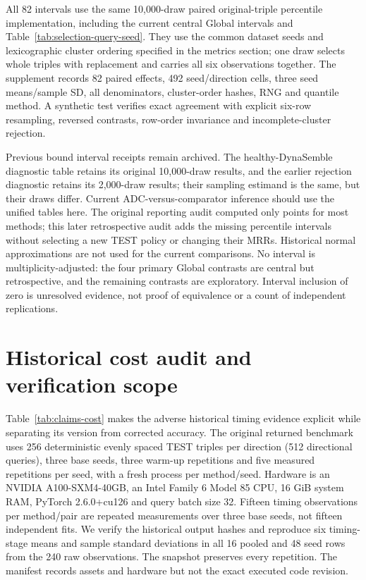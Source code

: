\documentclass[11pt,a4paper]{article}
\begin{document}
All 82 intervals use the same 10,000-draw paired original-triple percentile implementation, including the current central Global intervals and Table~\ref{tab:selection-query-seed}. They use the common dataset seeds and lexicographic cluster ordering specified in the metrics section; one draw selects whole triples with replacement and carries all six observations together. The supplement records 82 paired effects, 492 seed/direction cells, three seed means/sample SD, all denominators, cluster-order hashes, RNG and quantile method. A synthetic test verifies exact agreement with explicit six-row resampling, reversed contrasts, row-order invariance and incomplete-cluster rejection.

Previous bound interval receipts remain archived. The healthy-DynaSemble diagnostic table retains its original 10,000-draw results, and the earlier rejection diagnostic retains its 2,000-draw results; their sampling estimand is the same, but their draws differ. Current ADC-versus-comparator inference should use the unified tables here. The original reporting audit computed only points for most methods; this later retrospective audit adds the missing percentile intervals without selecting a new TEST policy or changing their MRRs. Historical normal approximations are not used for the current comparisons. No interval is multiplicity-adjusted: the four primary Global contrasts are central but retrospective, and the remaining contrasts are exploratory. Interval inclusion of zero is unresolved evidence, not proof of equivalence or a count of independent replications.




\section{Historical cost audit and verification scope}
\label{app:efficiency}
Table~\ref{tab:claims-cost} makes the adverse historical timing evidence explicit while separating its version from corrected accuracy. The original returned benchmark uses 256 deterministic evenly spaced TEST triples per direction (512 directional queries), three base seeds, three warm-up repetitions and five measured repetitions per seed, with a fresh process per method/seed. Hardware is an NVIDIA A100-SXM4-40GB, an Intel Family 6 Model 85 CPU, 16 GiB system RAM, PyTorch 2.6.0+cu126 and query batch size 32. Fifteen timing observations per method/pair are repeated measurements over three base seeds, not fifteen independent fits. We verify the historical output hashes and reproduce six timing-stage means and sample standard deviations in all 16 pooled and 48 seed rows from the 240 raw observations. The snapshot preserves every repetition. The manifest records assets and hardware but not the exact executed code revision.

\end{document}
